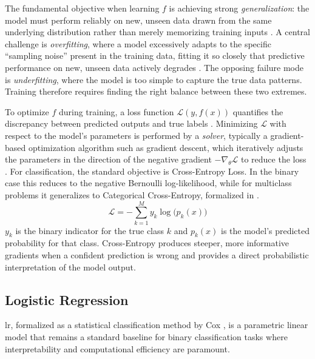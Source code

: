 The fundamental objective when learning $f$ is achieving strong \textit{generalization}: the model must perform reliably on new, unseen data drawn from the same underlying distribution rather than merely memorizing training inputs \parencite{srivastavaDropoutSimpleWay2014}. A central challenge is \textit{overfitting}, where a model excessively adapts to the specific ``sampling noise'' present in the training data, fitting it so closely that predictive performance on new, unseen data actively degrades \parencite{srivastavaDropoutSimpleWay2014, friedmanGreedyFunctionApproximation2001}. The opposing failure mode is \textit{underfitting}, where the model is too simple to capture the true data patterns. Training therefore requires finding the right balance between these two extremes.

To optimize $f$ during training, a loss function $\mathcal{L}(y, f(x))$ quantifies the discrepancy between predicted outputs and true labels \parencite{friedmanGreedyFunctionApproximation2001}. Minimizing $\mathcal{L}$ with respect to the model's parameters is performed by a \textit{solver}, typically a gradient-based optimization algorithm such as gradient descent, which iteratively adjusts the parameters in the direction of the negative gradient $-\nabla_\theta \mathcal{L}$ to reduce the loss \parencite{friedmanGreedyFunctionApproximation2001}. For classification, the standard objective is Cross-Entropy Loss. In the binary case this reduces to the negative Bernoulli log-likelihood, while for multiclass problems it generalizes to Categorical Cross-Entropy, formalized in .
\begin{equation}
    \mathcal{L} = -\sum_{k=1}^{M} y_k \log\bigl(p_k(x)\bigr)
    \label{eq:cross_entropy}
\end{equation}
$y_k$ is the binary indicator for the true class $k$ and $p_k(x)$ is the model's predicted probability for that class. Cross-Entropy produces steeper, more informative gradients when a confident prediction is wrong and provides a direct probabilistic interpretation of the model output.

\subsection{Logistic Regression}
\label{sec:theoretical_lr}

\gls{lr}, formalized as a statistical classification method by Cox \parencite{coxRegressionAnalysisBinary1958}, is a parametric linear model that remains a standard baseline for binary classification tasks where interpretability and computational efficiency are paramount.

